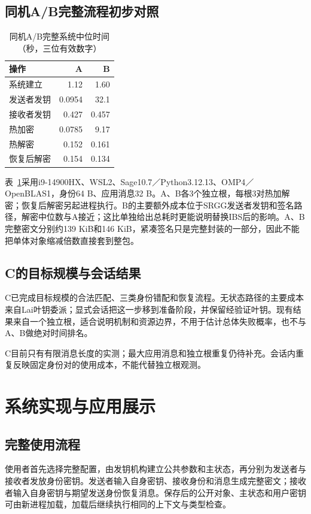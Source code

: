 \documentclass[UTF8,a4paper,12pt,oneside,openany,fontset=fandol]{ctexrep}
\begin{document}
\section{同机A/B完整流程初步对照}
\begin{table}[htbp]
\centering
\small
\caption{同机A/B完整系统中位时间（秒，三位有效数字）}
\label{tab:same-machine-ab-initial}
\begin{tabular}{@{}lrr@{}}
\toprule
\rowcolor{black!8} 操作 & A & B \\
\midrule
系统建立 & 1.12 & 1.60 \\
发送者发钥 & 0.0954 & 32.1 \\
接收者发钥 & 0.427 & 0.457 \\
热加密 & 0.0785 & 9.17 \\
热解密 & 0.152 & 0.161 \\
恢复后解密 & 0.154 & 0.134 \\
\bottomrule
\end{tabular}
\end{table}

表~\ref{tab:same-machine-ab-initial}采用i9-14900HX、WSL2、Sage10.7／Python3.12.13、OMP4／OpenBLAS1，身份64 B、应用消息32 B。A、B各3个独立根，每根3对热加解密；恢复后解密另起进程执行。B的主要额外成本位于SRGG发送者发钥和签名路径，解密中位数与A接近；这比单独给出总耗时更能说明替换IBS后的影响。A、B完整密文分别约139 KiB和146 KiB，紧凑签名只是完整封装的一部分，因此不能把单体对象缩减倍数直接套到整包。

\section{C的目标规模与会话结果}
C已完成目标规模的合法匹配、三类身份错配和恢复流程。无状态路径的主要成本来自Lai叶钥委派；显式会话把这一步移到准备阶段，并保留经验证叶钥。现有结果来自一个独立根，适合说明机制和资源边界，不用于估计总体失败概率，也不与A、B做绝对时间排名。

C目前只有有限消息长度的实测；最大应用消息和独立根重复仍待补充。会话内重复反映固定身份对的使用成本，不能代替独立根观测。

\chapter{系统实现与应用展示}

\section{完整使用流程}
使用者首先选择完整配置，由发钥机构建立公共参数和主状态，再分别为发送者与接收者发放身份密钥。发送者输入自身密钥、接收身份和消息生成完整密文；接收者输入自身密钥与期望发送身份恢复消息。保存后的公开对象、主状态和用户密钥可由新进程加载，加载后继续执行相同的上下文与类型检查。
\end{document}
